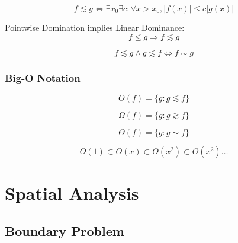 \[
    f \lesssim g \Leftrightarrow
    \exists x_0 \exists c : \forall x > x_0, |f(x)| \leq c |g(x)|
\]

Pointwise Domination implies Linear Dominance:
\[
    f \leq g \Rightarrow f \lesssim g
\]

\[
    f \lesssim g \wedge g \lesssim f \Leftrightarrow f \sim g
\]



\subsubsection{Big-O Notation}\label{sec:bigo_notation}

\[
    O(f) = \{ g : g \lesssim f \}
\]

\[
    \Omega(f) = \{ g : g \gtrsim f \}
\]

\[
    \Theta(f) = \{ g : g \sim f \}
\]

\[
    O(1) \subset O(x) \subset O(x^2) \subset O(x^2) \ldots
\]



\section{Spatial Analysis}\label{sec:spatial_analysis}


\subsection{Boundary Problem}\label{sec:boundary_problem}

